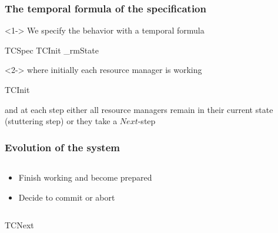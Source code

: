 \begin{frame}
    \frametitle{The temporal formula of the specification}
    \begin{uncoverenv}<1->
            We specify the behavior with a temporal formula
        \begin{tlabox}
            TCSpec  TCInit \land \Box [TCNext]_{rmState}
        \end{tlabox}
    \end{uncoverenv}
    \begin{uncoverenv}<2->
        where initially each resource manager is working
        \begin{tlabox}
            TCInit 
        \end{tlabox}
        and at each step either all resource managers remain in their
        current state (stuttering step) or they take a $Next$-step
    \end{uncoverenv}
\end{frame}

\begin{frame}
    \frametitle{Evolution of the system}

    \begin{columns}[c]
    \begin{column}{0.65\textwidth}

        \begin{itemize}
            \item<2> Finish working and become prepared
            \item<3> Decide to commit or abort
        \end{itemize}
    \end{column}
    \begin{column}{0.35\textwidth}
        \centering
    \end{column}
    \end{columns}
    \vspace{\baselineskip}
    \begin{tlabox}
        TCNext  {}
         
    \end{tlabox}
\end{frame}

